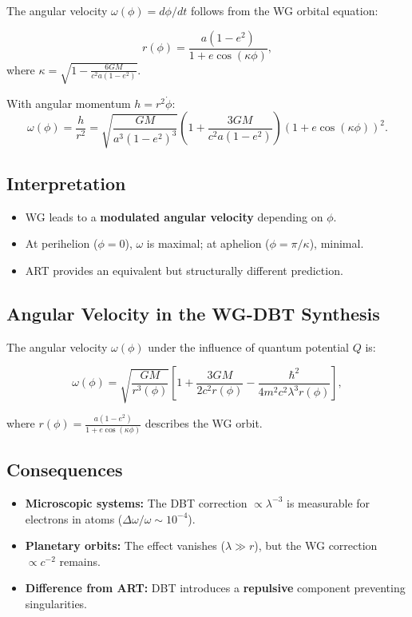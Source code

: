 The angular velocity $\omega(\phi) = d\phi/dt$ follows from the WG orbital equation:

\begin{equation}
r(\phi) = \frac{a(1 - e^2)}{1 + e \cos(\kappa \phi)},
\end{equation}
where $\kappa = \sqrt{1 - \frac{6GM}{c^2 a (1 - e^2)}}$. 

With angular momentum $h = r^2 \dot{\phi}$:
\begin{equation}
\omega(\phi) = \frac{h}{r^2} = \sqrt{\frac{GM}{a^3 (1 - e^2)^3}} \left(1 + \frac{3GM}{c^2 a (1 - e^2)}\right) \left(1 + e \cos(\kappa \phi)\right)^2.
\end{equation}

\subsection*{Interpretation}
\begin{itemize}
\item WG leads to a \textbf{modulated angular velocity} depending on $\phi$.
\item At perihelion ($\phi = 0$), $\omega$ is maximal; at aphelion ($\phi = \pi/\kappa$), minimal.
\item ART provides an equivalent but structurally different prediction.
\end{itemize}

\subsection{Angular Velocity in the WG-DBT Synthesis}  
\label{sec:omega_dbt}  

The angular velocity $\omega(\phi)$ under the influence of quantum potential $Q$ is:  

\begin{equation}  
\omega(\phi) = \sqrt{\frac{GM}{r^3(\phi)}} \left[1 + \frac{3GM}{2c^2 r(\phi)} - \frac{\hbar^2}{4m^2 c^2 \lambda^3 r(\phi)}\right],  
\end{equation}  

where $r(\phi) = \frac{a(1-e^2)}{1 + e \cos(\kappa \phi)}$ describes the WG orbit.  

\subsection*{Consequences}  
\begin{itemize}  
\item \textbf{Microscopic systems:} The DBT correction $\propto \lambda^{-3}$ is measurable for electrons in atoms ($\Delta \omega/\omega \sim 10^{-4}$).  
\item \textbf{Planetary orbits:} The effect vanishes ($\lambda \gg r$), but the WG correction $\propto c^{-2}$ remains.  
\item \textbf{Difference from ART:} DBT introduces a \textbf{repulsive} component preventing singularities.  
\end{itemize}